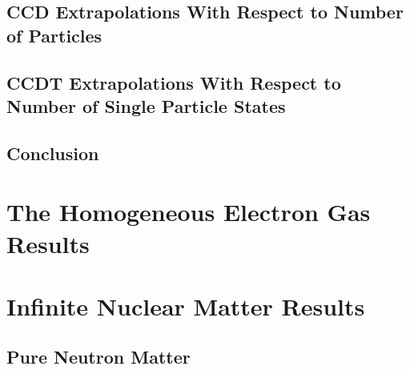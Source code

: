 \documentclass[12pt]{book}
\begin{document}
        \section{CCD Extrapolations With Respect to Number of Particles}
            

        \section{CCDT Extrapolations With Respect to Number of Single Particle States}
            

        \section{Conclusion}
            


\chapter{The Homogeneous Electron Gas Results}
    
    
    
    
    
    



\chapter{Infinite Nuclear Matter Results}
    
    \section{Pure Neutron Matter}

        
        
        
        
\end{document}
